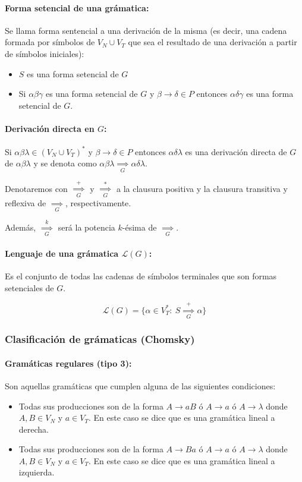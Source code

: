 \paragraph{Forma setencial de una grámatica:} Se llama forma sentencial a una derivación de la misma (es decir, una cadena formada por símbolos de \(V_N\cup V_T\) que sea el resultado de una derivación a partir de símbolos iniciales):
\begin{itemize}
  \item \(S\) es una forma setencial de \(G\)
  \item Si \(\alpha\beta\gamma\) es una forma setencial de \(G\) y \(\beta\to\delta\in P\) entonces \(\alpha\delta\gamma\) es una forma setencial de \(G\).
\end{itemize}

\paragraph{Derivación directa en \(G\):} Si \(\alpha\beta\lambda\in(V_N\cup V_T)^*\) y \(\beta\to\delta\in P\) entonces \(\alpha\delta\lambda\) es una derivación directa de \(G\) de \(\alpha\beta\lambda\) y se denota como \(\alpha\beta\lambda\underset{G}{\implies}\alpha\delta\lambda\).

Denotaremos con \(\overset{+}{\underset{G}{\implies}}\) y \(\overset{*}{\underset{G}{\implies}}\) a la clausura positiva y la clausura transitiva y reflexiva de \(\underset{G}{\implies}\), respectivamente.

Además, \(\overset{k}{\underset{G}{\implies}}\) será la potencia \(k\)-ésima de \(\underset{G}{\implies}\).

\paragraph{Lenguaje de una grámatica \(\mathcal{L}(G)\):} Es el conjunto de todas las cadenas de símbolos terminales que son formas setenciales de \(G\).

\[ \mathcal{L}(G) = \{ \alpha\in V_T^*:~S\overset{+}{\underset{G}{\implies}}\alpha\}\]

\subsubsection{Clasificación de grámaticas (Chomsky)}
\paragraph{Gramáticas regulares (tipo 3):} Son aquellas gramáticas que cumplen alguna de las siguientes condiciones:
\begin{itemize}
  \item Todas sus producciones son de la forma \(A\to aB\) ó \(A\to a\) ó \(A\to\lambda\) donde \(A,B\in V_N\) y \(a\in V_T\). En este caso se dice que es una gramática lineal a derecha.
  \item Todas sus producciones son de la forma \(A\to Ba\) ó \(A\to a\) ó \(A\to\lambda\) donde \(A,B\in V_N\) y \(a\in V_T\). En este caso se dice que es una gramática lineal a izquierda.
\end{itemize}

